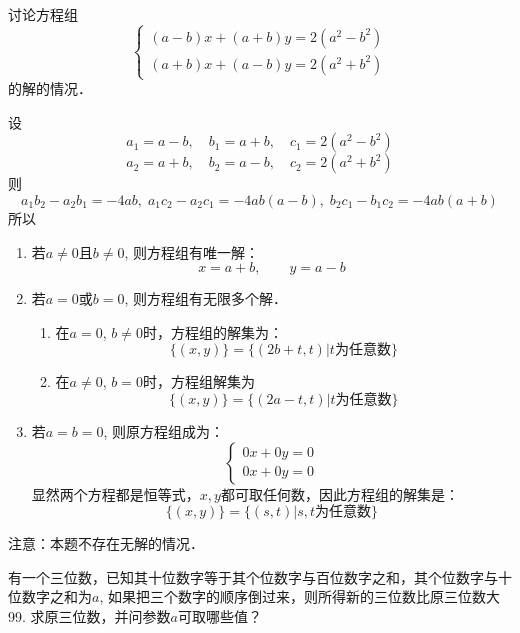 \begin{example}
讨论方程组
\[\begin{cases}
    (a-b) x+ (a+b) y=2 (a^2-b^2)\\
    (a+b) x+ (a-b)y=2 (a^2+b^2)
\end{cases}\]
的解的情况．    
\end{example}

\begin{solution}
设$$a_1=a-b,\quad b_1 =a+b,\quad c_1=2 (a^2-b^2)$$
$$a_2=a+b,\quad b_2 =a-b,\quad c_2=2 (a^2+b^2)$$
则$$a_1b_2-a_2b_1=-4ab,\; a_1c_2-a_2c_1=-4ab(a-b),\; b_2c_1-b_1c_2=-4ab(a+b)$$所以
\begin{enumerate}
\item 若$a\ne 0$且$b\ne 0$, 则方程组有唯一解：
\[x=a+b,\qquad y=a-b\]
\item 若$a=0$或$b=0$, 则方程组有无限多个解．
\begin{enumerate}
    \item 在$a=0$, $b\ne 0$时，方程组的解集为：
\[\{(x,y)\}=\{(2b+t,t)|\text{$t$为任意数}\}\]
\item 在$a\ne 0$, $b=0$时，方程组解集为
\[\{(x,y)\}=\{(2a-t,t)|\text{$t$为任意数}\}\]
\end{enumerate}

\item 若$a=b=0$, 则原方程组成为：
\[\begin{cases}
    0x+0y=0 \\ 0x+0y=0 
\end{cases}\]
显然两个方程都是恒等式，$x,y$都可取任何数，因此方程组的解集是：
\[\{(x,y)\} =\{ (s,t)|\text{$s,t$为任意数}\}\]
\end{enumerate}
注意：本题不存在无解的情况．
\end{solution}

\begin{example}
有一个三位数，已知其十位数字等于其个位数字与百位数字之和，其个位数字与十位数字之和为$a$, 如果把三个数字的顺序倒过来，则所得新的三位数比原三位数大99. 求原三位数，并问参数$a$可取哪些值？
\end{example}


